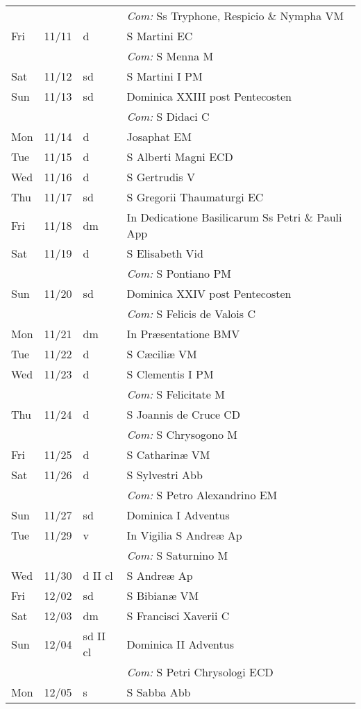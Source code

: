 \documentclass[10pt]{article}
\begin{document}
\begin{longtable}{ l l l l }
 & & & \textit{Com:} Ss Tryphone, Respicio \& Nympha VM\\
Fri & 11/11 & d & S Martini  EC\\
 & & & \textit{Com:} S Menna M\\
Sat & 11/12 & sd & S Martini I PM\\
Sun & 11/13 & sd & Dominica XXIII post Pentecosten\\
 & & & \textit{Com:} S Didaci C\\
Mon & 11/14 & d & Josaphat EM\\
Tue & 11/15 & d & S Alberti Magni ECD\\
Wed & 11/16 & d & S Gertrudis V\\
Thu & 11/17 & sd & S Gregorii Thaumaturgi EC\\
Fri & 11/18 & dm & In Dedicatione Basilicarum Ss Petri \& Pauli App\\
Sat & 11/19 & d & S Elisabeth Vid\\
 & & & \textit{Com:} S Pontiano PM\\
Sun & 11/20 & sd & Dominica XXIV post Pentecosten\\
 & & & \textit{Com:} S Felicis de Valois C\\
Mon & 11/21 & dm & In Præsentatione BMV\\
Tue & 11/22 & d & S Cæciliæ VM\\
Wed & 11/23 & d & S Clementis I PM\\
 & & & \textit{Com:} S Felicitate M\\
Thu & 11/24 & d & S Joannis de Cruce CD\\
 & & & \textit{Com:} S Chrysogono M\\
Fri & 11/25 & d & S Catharinæ VM\\
Sat & 11/26 & d & S Sylvestri Abb\\
 & & & \textit{Com:} S Petro Alexandrino EM\\
Sun & 11/27 & sd & Dominica I Adventus\\
Tue & 11/29 & v & In Vigilia S Andreæ Ap\\
 & & & \textit{Com:} S Saturnino M\\
Wed & 11/30 & d II cl & S Andreæ Ap\\
Fri & 12/02 & sd & S Bibianæ VM\\
Sat & 12/03 & dm & S Francisci Xaverii C\\
Sun & 12/04 & sd II cl & Dominica II Adventus\\
 & & & \textit{Com:} S Petri Chrysologi ECD\\
Mon & 12/05 & s & S Sabba Abb\\

\end{longtable}
\end{document}
